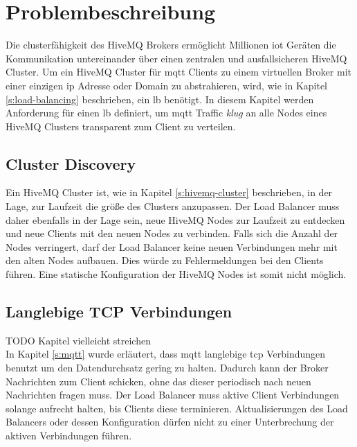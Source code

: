 \section{Problembeschreibung} \label{s:problem}
Die clusterfähigkeit des HiveMQ Brokers ermöglicht Millionen \ac{iot} Geräten die Kommunikation untereinander über einen zentralen und ausfallsicheren HiveMQ Cluster.
Um ein HiveMQ Cluster für \ac{mqtt} Clients zu einem virtuellen Broker mit einer einzigen \ac{ip} Adresse oder Domain zu abstrahieren, wird, wie in Kapitel \ref{s:load-balancing} beschrieben, ein \acl{lb} benötigt.
In diesem Kapitel werden Anforderung für einen \acl{lb} definiert, um \ac{mqtt} Traffic \textit{klug} an alle Nodes eines HiveMQ Clusters transparent zum Client zu verteilen.

\subsection{Cluster Discovery} \label{sp:cluster-discovery}
Ein HiveMQ Cluster ist, wie in Kapitel \ref{s:hivemq-cluster} beschrieben, in der Lage, zur Laufzeit die grö{\ss}e des Clusters anzupassen. Der Load Balancer muss daher ebenfalls in der Lage sein, neue HiveMQ Nodes zur Laufzeit zu entdecken und neue Clients mit den neuen Nodes zu verbinden. Falls sich die Anzahl der Nodes verringert, darf der Load Balancer keine neuen Verbindungen mehr mit den alten Nodes aufbauen. Dies würde zu Fehlermeldungen bei den Clients führen.
Eine statische Konfiguration der HiveMQ Nodes ist somit nicht möglich.

\subsection{Langlebige TCP Verbindungen}
TODO Kapitel vielleicht streichen
\\
In Kapitel \ref{s:mqtt} wurde erläutert, dass \ac{mqtt} langlebige \ac{tcp} Verbindungen benutzt um den Datendurchsatz gering zu halten. Dadurch kann der Broker Nachrichten zum Client schicken, ohne das dieser periodisch nach neuen Nachrichten fragen muss.
Der Load Balancer muss aktive Client Verbindungen solange aufrecht halten, bis Clients diese terminieren.
Aktualisierungen des Load Balancers oder dessen Konfiguration dürfen nicht zu einer Unterbrechung der aktiven Verbindungen führen.

